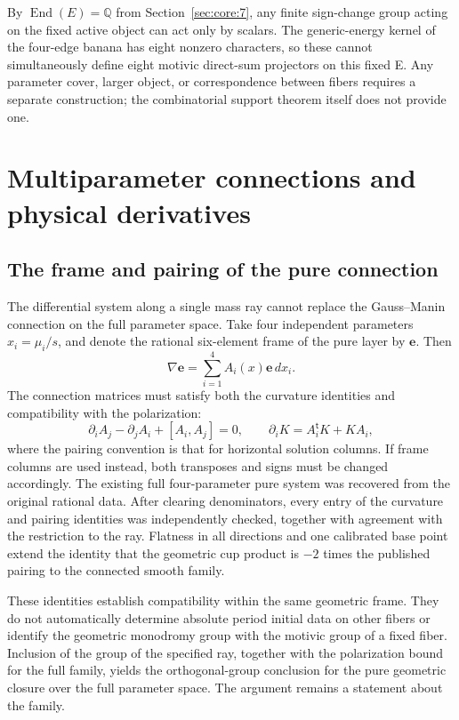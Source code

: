 \documentclass[11pt,a4paper,oneside]{article}
\theoremstyle{plain}
\theoremstyle{definition}
\theoremstyle{remark}
\numberwithin{equation}{section}
\begin{document}
By \(\operatorname{End}(E)=\mathbb Q\) from Section~\ref{sec:core:7}, any finite sign-change group acting on the fixed active object can act only by scalars. The generic-energy kernel of the four-edge banana has eight nonzero characters, so these cannot simultaneously define eight motivic direct-sum projectors on this fixed E. Any parameter cover, larger object, or correspondence between fibers requires a separate construction; the combinatorial support theorem itself does not provide one.



\endgroup




\section{Multiparameter connections and physical derivatives}\label{ch:connection}\label{ch:deriv}

\begingroup


\subsection{The frame and pairing of the pure connection}
The differential system along a single mass ray cannot replace the Gauss--Manin connection on the full parameter space. Take four independent parameters $x_i=\mu_i/s$, and denote the rational six-element frame of the pure layer by $\mathbf e$. Then
\begin{equation}
 \nabla\mathbf e=\sum_{i=1}^4 A_i(x)\mathbf e\,dx_i.
\end{equation}
The connection matrices must satisfy both the curvature identities and compatibility with the polarization:
\begin{equation}
 \partial_iA_j-\partial_jA_i+[A_i,A_j]=0,\qquad
 \partial_iK=A_i^{\mathsf t}K+KA_i,
\end{equation}
where the pairing convention is that for horizontal solution columns. If frame columns are used instead, both transposes and signs must be changed accordingly. The existing full four-parameter pure system was recovered from the original rational data. After clearing denominators, every entry of the curvature and pairing identities was independently checked, together with agreement with the restriction to the ray. Flatness in all directions and one calibrated base point extend the identity that the geometric cup product is $-2$ times the published pairing to the connected smooth family.

These identities establish compatibility within the same geometric frame. They do not automatically determine absolute period initial data on other fibers or identify the geometric monodromy group with the motivic group of a fixed fiber. Inclusion of the group of the specified ray, together with the polarization bound for the full family, yields the orthogonal-group conclusion for the pure geometric closure over the full parameter space. The argument remains a statement about the family.
\end{document}
